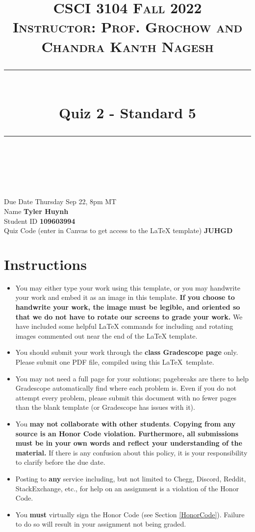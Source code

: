\documentclass[11pt]{article}
\title{
\normalfont \normalsize 
\textsc{CSCI 3104 Fall 2022 \\ 
Instructor: Prof. Grochow and Chandra Kanth Nagesh} \\
[10pt] 
\rule{\linewidth}{0.5pt} \\[6pt] 
\huge Quiz 2 - Standard 5 \\
\rule{\linewidth}{2pt}  \\[10pt]
}
\date{}
\theoremstyle{definition}
\theoremstyle{definition}
\theoremstyle{definition}
\begin{document}
\maketitle


\noindent
Due Date \dotfill Thursday Sep 22, 8pm MT \\
Name \dotfill \textbf{Tyler Huynh} \\
Student ID \dotfill \textbf{109603994} \\
Quiz Code (enter in Canvas to get access to the LaTeX template) \dotfill \textbf{JUHGD}


\tableofcontents

\section*{Instructions}
 \begin{itemize}
	\item You may either type your work using this template, or you may handwrite your work and embed it as an image in this template. \textbf{If you choose to handwrite your work, the image must be legible, and oriented so that we do not have to rotate our screens to grade your work.} We have included some helpful LaTeX commands for including and rotating images commented out near the end of the LaTeX template.
	\item You should submit your work through the \textbf{class Gradescope page} only. Please submit one PDF file, compiled using this \LaTeX \ template.
	\item You may not need a full page for your solutions; pagebreaks are there to help Gradescope automatically find where each problem is. Even if you do not attempt every problem, please submit this document with no fewer pages than the blank template (or Gradescope has issues with it).

	\item You \textbf{may not collaborate with other students}. \textbf{Copying from any source is an Honor Code violation. Furthermore, all submissions must be in your own words and reflect your understanding of the material.} If there is any confusion about this policy, it is your responsibility to clarify before the due date. 

	\item Posting to \textbf{any} service including, but not limited to Chegg, Discord, Reddit, StackExchange, etc., for help on an assignment is a violation of the Honor Code.

	\item You \textbf{must} virtually sign the Honor Code (see Section \ref{HonorCode}). Failure to do so will result in your assignment not being graded.
\end{itemize}
\end{document}
